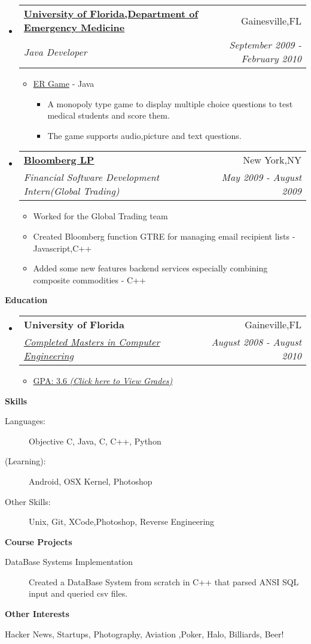 \documentclass[letterpaper,11pt]{article}
\makeatletter
\newcommand{\resitem}[1]{\item #1 \vspace{-2pt}}
\newcommand{\resheading}[1]{{\large \colorbox{mygrey}{\begin{minipage}{\textwidth}{\textbf{#1 \vphantom{p\^{E}}}}\end{minipage}}}}
\newcommand{\ressubheading}[4]{
\begin{tabular*}{7.0in}{l@{\extracolsep{\fill}}r}
		\textbf{#1} & #2 \\
		\textit{#3} & \textit{#4} \\
\end{tabular*}\vspace{-6pt}}
\makeatother
\begin{document}
\begin{itemize}
\item
    \ressubheading{\href{http://emergency.med.ufl.edu}{University of Florida,Department of Emergency Medicine}}{Gainesville,FL}{Java Developer}{September 2009 - February 2010}
    \begin{itemize}
        \resitem{\href{http://onlinelibrary.wiley.com/doi/10.1111/j.1553-2712.2009.00392_16.x/abstract}{ER Game} - Java}
        \begin{itemize}
            \resitem{A monopoly type game to display multiple choice questions to test medical students and score them.}
            \resitem{The game supports audio,picture and text questions.}
        \end{itemize}
    \end{itemize}
                
\item
    \ressubheading{\href{http://www.bloomberg.com}{Bloomberg LP}}{New York,NY}{Financial Software Development Intern(Global Trading)}{May 2009 - August 2009}
    \begin{itemize}
        \resitem{Worked for the Global Trading team}
        \resitem{Created Bloomberg function GTRE for managing email recipient lists - Javascript,C++}
        \resitem{Added some new features backend services especially combining composite commodities - C++ }
    \end{itemize}
\end{itemize}

	
\resheading{Education}
\begin{itemize}
\item
    \ressubheading{University of Florida}{Gaineville,FL}{\href{http://dl.dropbox.com/u/23360122/UF_Grades.pdf}{Completed Masters in Computer Engineering}}{August 2008 - August 2010}
    \begin{itemize}
        \resitem{\href{http://dl.dropbox.com/u/23360122/UF_Grades.pdf}{GPA: 3.6 \emph{(Click here to View Grades)}}}
    \end{itemize}
\end{itemize}

\newpage

\resheading{Skills}
\begin{description}
\item[Languages:]
Objective C, Java, C, C++, Python
\item[(Learning):]
Android, OSX Kernel, Photoshop
\item[Other Skills:]
Unix, Git, XCode,Photoshop, Reverse Engineering 
\end{description}

\resheading{Course Projects}
\begin{description}
\item[DataBase Systems Implementation] Created a DataBase System from scratch in C++ that parsed ANSI SQL input and queried csv files.
\end{description}


\resheading{Other Interests}
\begin{description}
\item Hacker News, Startups, Photography, Aviation ,Poker, Halo, Billiards, Beer!
\end{description}
\end{document}
